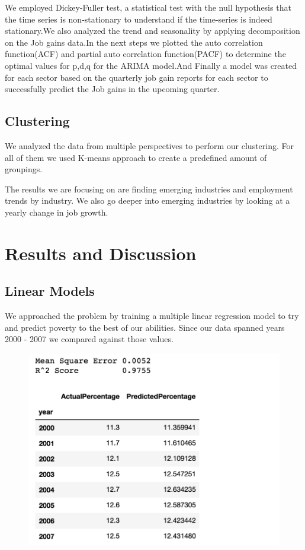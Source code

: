 \documentclass[11pt,letterpaper]{article}
\begin{document}
We employed Dickey-Fuller test, a statistical test with the null hypothesis that the time series is non-stationary to understand if the time-series is indeed stationary.We also analyzed the trend and seasonality by applying decomposition on the Job gains data.In the next steps we plotted the auto correlation function(ACF) and partial auto correlation function(PACF) to determine the optimal values for p,d,q for the ARIMA model.And Finally a model was created for each sector based on the quarterly job gain reports for each sector to successfully predict the Job gains in the upcoming quarter.

\subsection{Clustering}
\label{ssec:cluster}

We analyzed the data from multiple perspectives to perform our clustering. For all of them we used  K-means approach to create a predefined amount of groupings. 

The results we are focusing on are finding emerging industries and employment trends by industry. We also go deeper into emerging industries by looking at a yearly change in job growth.


\section{Results and Discussion}

\subsection{Linear Models}
\label{ssec:linearResults}
We approached the problem by training a multiple linear regression model to try and predict poverty to the best of our abilities. Since our data spanned years 2000 - 2007 we compared against those values. 

\begin{figure}[h]
	\includegraphics[width=\linewidth]{"./pictures/Mse_Score_Predictions"}
\end{figure}
\end{document}
